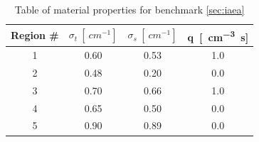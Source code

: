 \begin{table}
\centering
	\begin{tabular}{c|ccc}
		Region \# & $\sigma_t\ [\SI{}{cm^{-1}}]$ & $\sigma_s\ [\SI{}{cm^{-1}}]$ & q\ [\SI{}{cm^{-3}.s}] \\\hline
		1   & 0.60 & 0.53 & 1.0 \\[.2em] 
		2   & 0.48 & 0.20 & 0.0  \\[.2em] 
		3   & 0.70 & 0.66 & 1.0  \\[.2em] 
		4   & 0.65 & 0.50 & 0.0  \\[.2em] 
		5   & 0.90 & 0.89 & 0.0%
	\end{tabular} 
\caption{Table of material properties for benchmark \ref{sec:iaea}}
\label{tab:iaea-coef}
\end{table}

